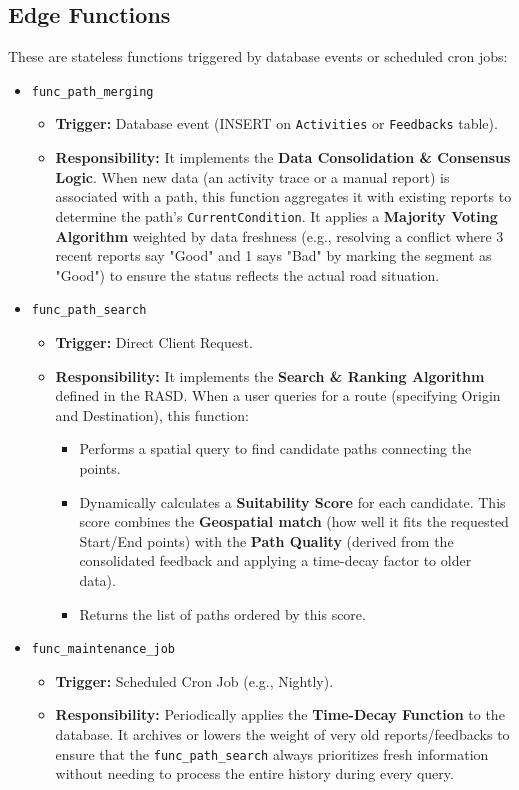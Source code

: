 \subsection{Edge Functions}
These are stateless functions triggered by database events or scheduled cron jobs:
\begin{itemize}
    \item \texttt{func\_path\_merging}
    \begin{itemize}
        \item \textbf{Trigger:} Database event (INSERT on \texttt{Activities} or \texttt{Feedbacks} table).
        \item \textbf{Responsibility:} It implements the \textbf{Data Consolidation \& Consensus Logic}. When new data (an activity trace or a manual report) is associated with a path, this function aggregates it with existing reports to determine the path's \texttt{CurrentCondition}. It applies a \textbf{Majority Voting Algorithm} weighted by data freshness (e.g., resolving a conflict where 3 recent reports say "Good" and 1 says "Bad" by marking the segment as "Good") to ensure the status reflects the actual road situation.
    \end{itemize}

    \item \texttt{func\_path\_search}
    \begin{itemize}
        \item \textbf{Trigger:} Direct Client Request.
        \item \textbf{Responsibility:} It implements the \textbf{Search \& Ranking Algorithm} defined in the RASD. When a user queries for a route (specifying Origin and Destination), this function:
        \begin{itemize}
            \item Performs a spatial query to find candidate paths connecting the points.
            \item Dynamically calculates a \textbf{Suitability Score} for each candidate. This score combines the \textbf{Geospatial match} (how well it fits the requested Start/End points) with the \textbf{Path Quality} (derived from the consolidated feedback and applying a time-decay factor to older data).
            \item Returns the list of paths ordered by this score.
        \end{itemize}
    \end{itemize}

    \item \texttt{func\_maintenance\_job}
    \begin{itemize}
        \item \textbf{Trigger:} Scheduled Cron Job (e.g., Nightly).
        \item \textbf{Responsibility:} Periodically applies the \textbf{Time-Decay Function} to the database. It archives or lowers the weight of very old reports/feedbacks to ensure that the \texttt{func\_path\_search} always prioritizes fresh information without needing to process the entire history during every query.
    \end{itemize}


\end{itemize}
